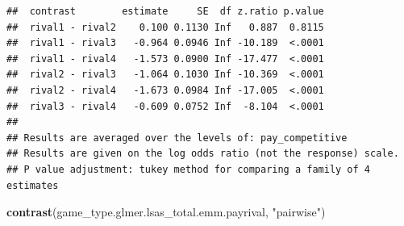 \documentclass[
]{article}
\newenvironment{Shaded}{\begin{snugshade}}{\end{snugshade}}
\newcommand{\FunctionTok}[1]{\textcolor[rgb]{0.13,0.29,0.53}{\textbf{#1}}}
\newcommand{\NormalTok}[1]{#1}
\newcommand{\StringTok}[1]{\textcolor[rgb]{0.31,0.60,0.02}{#1}}
\begin{document}
\begin{verbatim}
##  contrast        estimate     SE  df z.ratio p.value
##  rival1 - rival2    0.100 0.1130 Inf   0.887  0.8115
##  rival1 - rival3   -0.964 0.0946 Inf -10.189  <.0001
##  rival1 - rival4   -1.573 0.0900 Inf -17.477  <.0001
##  rival2 - rival3   -1.064 0.1030 Inf -10.369  <.0001
##  rival2 - rival4   -1.673 0.0984 Inf -17.005  <.0001
##  rival3 - rival4   -0.609 0.0752 Inf  -8.104  <.0001
## 
## Results are averaged over the levels of: pay_competitive 
## Results are given on the log odds ratio (not the response) scale. 
## P value adjustment: tukey method for comparing a family of 4 estimates
\end{verbatim}

\begin{Shaded}
\begin{Highlighting}[]
\FunctionTok{contrast}\NormalTok{(game\_type.glmer.lsas\_total.emm.payrival, }\StringTok{"pairwise"}\NormalTok{)}
\end{Highlighting}
\end{Shaded}
\end{document}

